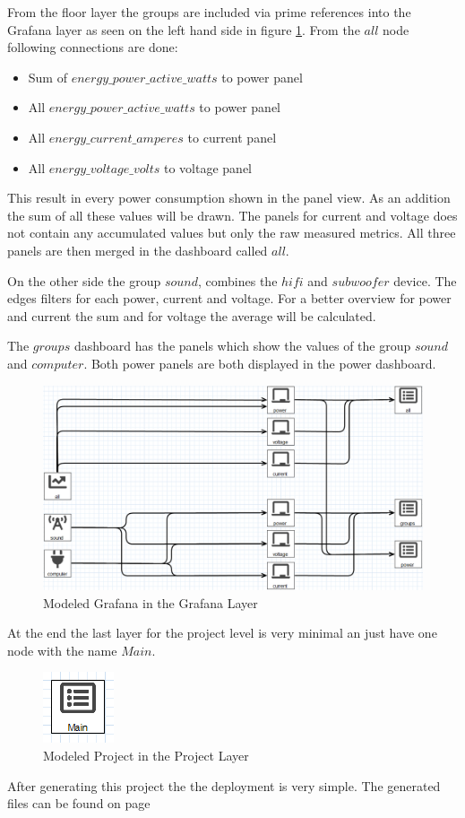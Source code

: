 From the floor layer the groups are included via prime references into the Grafana layer as seen on the left hand side in figure \ref{fig:modelGrafanaLayer}. From the $all$ node following connections are done:

\begin{itemize}
	\item Sum of $energy\_power\_active\_watts$ to power panel
	\item All $energy\_power\_active\_watts$ to power panel
	\item All $energy\_current\_amperes$ to current panel
 	\item All $energy\_voltage\_volts$ to voltage panel
\end{itemize}

This result in every power consumption shown in the panel view. As an addition the sum of all these values will be drawn. The panels for current and voltage does not contain any accumulated values but only the raw measured metrics. All three panels are then merged in the dashboard called $all$.

On the other side the group $sound$, combines the $hifi$ and $subwoofer$ device. The edges filters for each power, current and voltage. For a better overview for power and current the sum and for voltage the average will be calculated. 

The $groups$ dashboard has the panels which show the values of the group $sound$ and $computer$. Both power panels are both displayed in the power dashboard.

\begin{figure}[H]
	\centering 
	\includegraphics[width=\linewidth]{assets/images/grafanaLayer}
	\caption{Modeled Grafana in the Grafana Layer}
	\label{fig:modelGrafanaLayer}
\end{figure}

At the end the last layer for the project level is very minimal an just have one node with the name $Main$.

\begin{figure}[H]
	\centering
	\includegraphics{assets/images/projectLayer}
	\caption{Modeled Project in the Project Layer}
\end{figure}

After generating this project the the deployment is very simple. The generated files can be found on page \pageref{label}
